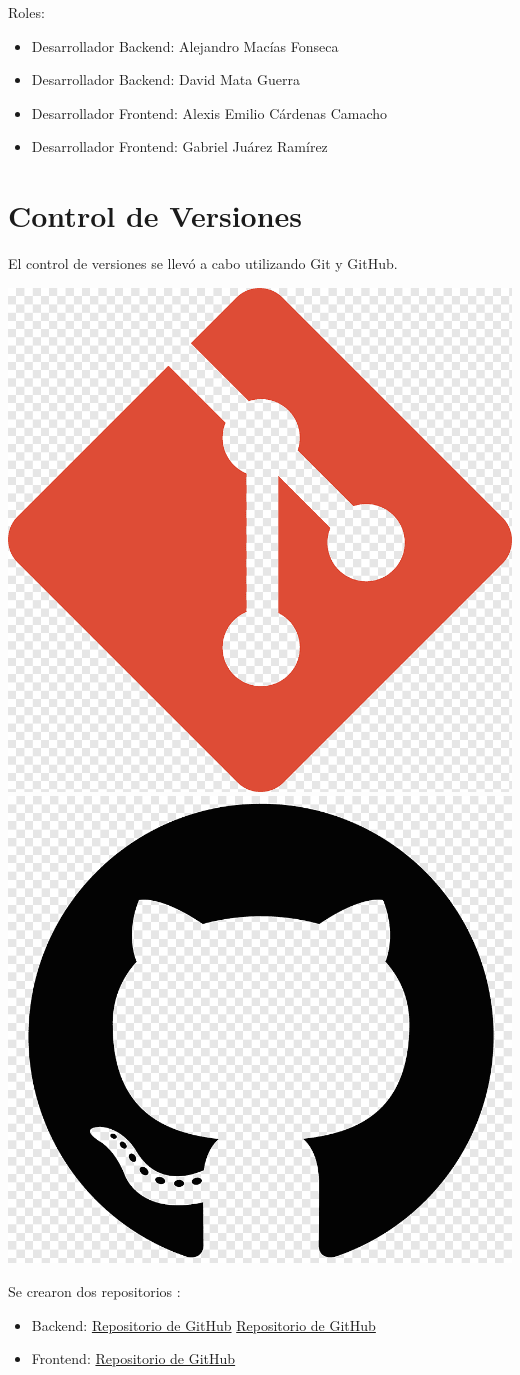 	Roles: 
	\begin{itemize}
		\item Desarrollador Backend: Alejandro Macías Fonseca
		\item Desarrollador Backend: David Mata Guerra
		\item Desarrollador Frontend: Alexis Emilio Cárdenas Camacho
		\item Desarrollador Frontend: Gabriel Juárez Ramírez
	\end{itemize}
	
	\section{Control de Versiones}
	El control de versiones se llevó a cabo utilizando Git y GitHub. 
		\begin{center}
		\includegraphics[width=0.3\linewidth]{./images/gitlogo.png}
		\includegraphics[width=0.3\linewidth]{./images/github_logo.png}
	\end{center}


	Se crearon dos repositorios :
	\begin{itemize}
	  \item Backend: \href{https://github.com/dmataguerra/proyecto_final_ing_requerimientos_back}{Repositorio de GitHub}
		\href{https://github.com/dmataguerra/nestJS-prisma-test}{Repositorio de GitHub}
	  \item Frontend: \href{https://github.com/Alexiiis21/frontend.git}{Repositorio de GitHub}	
	\end{itemize}


